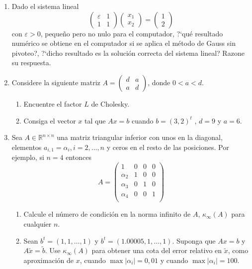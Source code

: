 \documentclass[12pt,letterpaper]{article}
\theoremstyle{plain}
\begin{document}
\begin{enumerate}
\item Dado el sistema lineal
$$
\left(\begin{array}{cc}
       \varepsilon & 1\\
      1 & 1
      \end{array}
\right)\left(\begin{array}{c}
              x_1\\
	      x_2
             \end{array}
\right)=\left(\begin{array}{c}
               1\\
	      2
              \end{array}
\right)
$$
con $\varepsilon > 0$, peque\~no pero no nulo para el computador, ?`qu\'e resultado num\'erico se obtiene en el computador si se aplica el m\'etodo de Gauss sin pivoteo?, ?`dicho resultado es la soluci\'on correcta del sistema lineal? Razone su respuesta.

\item Considere la siguiente matriz $A=\left(\begin{array}{cc}
                                              d & a\\
						a & d
                                             \end{array}
\right)$, donde $0<a<d$.
\begin{enumerate}
 \item Encuentre el factor $L$ de Cholesky.
\item Consiga el vector $x$ tal que $Ax = b$ cuando $b = (3, 2)^t$ , $d = 9$ y $a = 6$.
\end{enumerate}

\item Sea $A \in \mathbb{R}^{n\times n}$ una matriz triangular inferior con unos en la diagonal, elementos $a_{i,1} = \alpha_i , i = 2,\ldots,n$ y ceros en el resto de las posiciones. Por ejemplo, si $n = 4$ entonces
$$
A=\left(\begin{array}{cccc}
       1 & 0 & 0 & 0\\
      \alpha_2 & 1 & 0 & 0\\
      \alpha_3 & 0 & 1 & 0\\
      \alpha_4 & 0 & 0 & 1\\
      \end{array}\right)
$$
\begin{enumerate}
 \item Calcule el n\'umero de condici\'on en la norma infinito de $A$, $\kappa_\infty(A)$ para cualquier $n$.
\item Sean $b^t = (1, 1,\ldots, 1)$ y $b^t = (1.00005, 1,\ldots, 1)$. Suponga que $Ax = b$ y $A\tilde{x} = \tilde{b}$. Use $\kappa_\infty(A)$ para obtener una cota del error relativo en $\tilde{x}$, como aproximaci\'on de $x$, cuando $\max|\alpha_i| = 0,01$ y cuando $\max|\alpha_i| = 100$.
\end{enumerate}


\end{enumerate}
\end{document}

